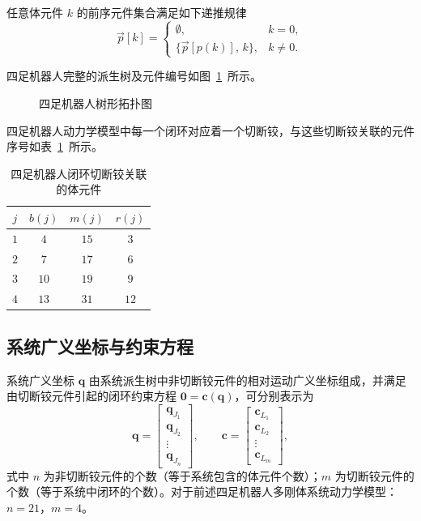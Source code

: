 任意体元件 $k$ 的前序元件集合满足如下递推规律
\begin{equation}\label{eq:10.1}
  \vec{p}[k] = \begin{cases}
    \emptyset, & k = 0, \\
    \{\vec{p}[p(k)],\, k\}, & k \neq 0.
  \end{cases}
\end{equation}

四足机器人完整的派生树及元件编号如图~\ref{fig:10.4}~所示。

\begin{figure}[htbp]
  \centering
  \caption{四足机器人树形拓扑图}
  \label{fig:10.4}
\end{figure}

四足机器人动力学模型中每一个闭环对应着一个切断铰，与这些切断铰关联的元件序号如表~\ref{tab:10.2}~所示。

\begin{table}[htbp]
  \centering
  \caption{四足机器人闭环切断铰关联的体元件}
  \label{tab:10.2}
  \begin{tabular}{cccc}
    \hline
    $j$ & $b(j)$ & $m(j)$ & $r(j)$ \\
    \hline
    $1$ & $4$  & $15$ & $3$ \\
    $2$ & $7$  & $17$ & $6$ \\
    $3$ & $10$ & $19$ & $9$ \\
    $4$ & $13$ & $31$ & $12$ \\
    \hline
  \end{tabular}
\end{table}

\subsection{系统广义坐标与约束方程}

系统广义坐标 $\boldsymbol{q}$ 由系统派生树中非切断铰元件的相对运动广义坐标组成，并满足由切断铰元件引起的闭环约束方程 $\boldsymbol{0} = \boldsymbol{c}(\boldsymbol{q})$，可分别表示为
\begin{equation}\label{eq:10.2}
  \boldsymbol{q} = \begin{bmatrix} \boldsymbol{q}_{J_1} \\ \boldsymbol{q}_{J_2} \\ \vdots \\ \boldsymbol{q}_{J_n} \end{bmatrix}, \qquad
  \boldsymbol{c} = \begin{bmatrix} \boldsymbol{c}_{L_1} \\ \boldsymbol{c}_{L_2} \\ \vdots \\ \boldsymbol{c}_{L_m} \end{bmatrix},
\end{equation}
式中 $n$ 为非切断铰元件的个数（等于系统包含的体元件个数）；$m$ 为切断铰元件的个数（等于系统中闭环的个数）。对于前述四足机器人多刚体系统动力学模型：$n = 21$，$m = 4$。

